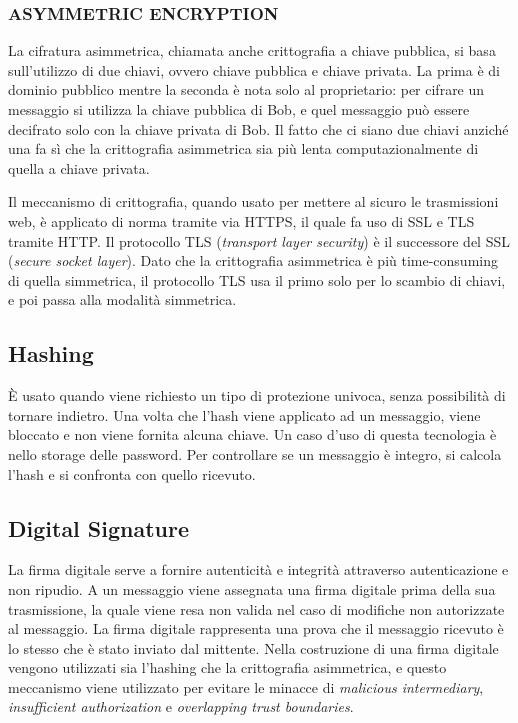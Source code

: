 \subsubsection{ASYMMETRIC ENCRYPTION}
La cifratura asimmetrica, chiamata anche crittografia a chiave pubblica, si basa sull'utilizzo di due chiavi, ovvero chiave pubblica e chiave privata. La prima è di dominio pubblico mentre la seconda è nota solo al proprietario: per cifrare un messaggio si utilizza la chiave pubblica di Bob, e quel messaggio può essere decifrato solo con la chiave privata di Bob. Il fatto che ci siano due chiavi anziché una fa sì che la crittografia asimmetrica sia più lenta computazionalmente di quella a chiave privata.

\begin{mdframed}[backgroundcolor=gray!20,shadow=false]
Il meccanismo di crittografia, quando usato per mettere al sicuro le trasmissioni web, è applicato di norma tramite via HTTPS, il quale fa uso di SSL e TLS tramite HTTP. Il protocollo TLS (\textit{transport layer security}) è il successore del SSL (\textit{secure socket layer}). Dato che la crittografia asimmetrica è più time-consuming di quella simmetrica, il protocollo TLS usa il primo solo per lo scambio di chiavi, e poi passa alla modalità simmetrica.
\end{mdframed}

\subsection{Hashing}
È usato quando viene richiesto un tipo di protezione univoca, senza possibilità di tornare indietro. Una volta che l'hash viene applicato ad un messaggio, viene bloccato e non viene fornita alcuna chiave. Un caso d'uso di questa tecnologia è nello storage delle password. Per controllare se un messaggio è integro, si calcola l'hash e si confronta con quello ricevuto.

\subsection{Digital Signature}
La firma digitale serve a fornire autenticità e integrità attraverso autenticazione e non ripudio. A un messaggio viene assegnata una firma digitale prima della sua trasmissione, la quale viene resa non valida nel caso di modifiche non autorizzate al messaggio. La firma digitale rappresenta una prova che il messaggio ricevuto è lo stesso che è stato inviato dal mittente. Nella costruzione di una firma digitale vengono utilizzati sia l'hashing che la crittografia asimmetrica, e questo meccanismo viene utilizzato per evitare le minacce di \textit{malicious intermediary}, \textit{insufficient authorization} e \textit{overlapping trust boundaries}.

